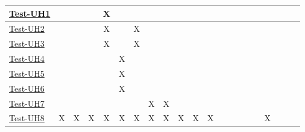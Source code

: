 \documentclass[12pt, titlepage]{article}
\begin{document}
\begin{landscape}
\begin{table}[H]
\begin{adjustwidth}{-0.3in}{-0.5in}
{\begin{tabular}{c|c|c|c|c|c|c|c|c|c|c|c|c|c|c|c|c|c|c|c|c|}
\multicolumn{1}{|l|}{\hyperref[itm:Test-UH1]{Test-UH1}}   &             &             &             &    X        &             &             &             &             &              &              &             &             &             &             &             &         & &&&    \\ \hline
\multicolumn{1}{|l|}{\hyperref[itm:Test-UH2]{Test-UH2}}   &             &             &             &      X      &             &      X       &             &             &              &              &              &              &             &             &             &          &&&&    \\ \hline
\multicolumn{1}{|l|}{\hyperref[itm:Test-UH3]{Test-UH3}}   &             &             &             &     X       &             &     X        &             &             &              &              &              &              &             &             &             &       &  &&&     \\ \hline
\multicolumn{1}{|l|}{\hyperref[itm:Test-UH4]{Test-UH4}}   &             &             &             &             &    X        &              &             &             &             &             &             &             &              &              &            &     &  &&&       \\ \hline
\multicolumn{1}{|l|}{\hyperref[itm:Test-UH5]{Test-UH5}}   &             &             &             &             &      X      &             &             &             &              &              &              &              &             &             &             &      &   &&&     \\ \hline
\multicolumn{1}{|l|}{\hyperref[itm:Test-UH6]{Test-UH6}}   &             &             &             &             &      X      &             &             &             &              &              &              &              &             &             &             &      &  &&&      \\ \hline
\multicolumn{1}{|l|}{\hyperref[itm:Test-UH7]{Test-UH7}}   &             &             &             &             &             &           &  X           &    X         &              &              &              &              &             &             &             &      &  &&&      \\ \hline
\multicolumn{1}{|l|}{\hyperref[itm:Test-UH8]{Test-UH8}}   &    X         &      X       &      X       &      X       &        X     &     X      &   X          &      X       &      X        &        X      &       X       &              &             &             &             &      & X &&&      \\ \hline

\end{tabular}}
\end{adjustwidth}
\end{table}
\end{landscape}
\end{document}
